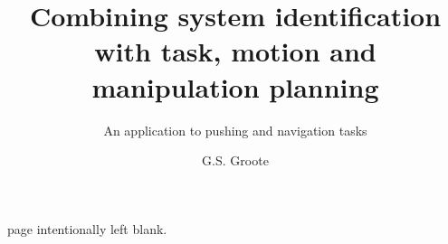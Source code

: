 \documentclass{layout/tudelft-report}
\begin{document}
\frontmatter

\title{Combining system identification with task, motion and\\manipulation planning}

\subtitle{An application to pushing and navigation tasks} 

\author{G.S. Groote}
\subject{SC52010: S\&C Literature Research}


\makecover
page intentionally left blank.
\newpage



\tableofcontents
\listoffigures
\listoftables

\mainmatter






% 

\setcounter{biburlnumpenalty}{7000}
\setcounter{biburllcpenalty}{7000}
\setcounter{biburlucpenalty}{7000}



\printbibliography[heading=bibintoc,title=References]
\end{document}
